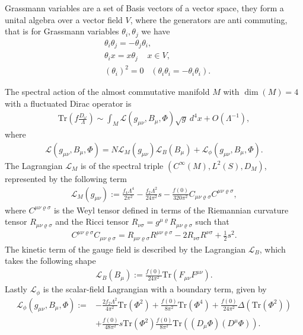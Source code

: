 Grassmann variables are a set of Basis vectors of a vector space, they
form a unital algebra over a vector field $V$, where the generators are
anti commuting, that is for Grassmann variables $\theta _i, \theta _j$  we have
\begin{align}
    &\theta _i \theta _j = -\theta _j \theta _i, \\
    &\theta _i x = x\theta _j \;\;\;\; x\in V, \\
    &(\theta_i)^2 = 0 \;\;\; (\theta _i \theta _i = -\theta _i \theta _i).
\end{align}
\begin{myproposition}
    The spectral action of the almost commutative manifold $M$ with $\dim(M)
    =4$ with a fluctuated Dirac operator is
    \begin{align}
        \text{Tr}(f\frac{D_\omega}{\Lambda}) \sim \int_M \mathcal{L}(g_{\mu\nu},
         B_\mu, \Phi) \sqrt{g}\ d^4x + O(\Lambda^{-1}),
    \end{align}
    where
    \begin{align}
        \mathcal{L}(g_{\mu\nu}, B_\mu, \Phi) =
        N\mathcal{L}_M(g_{\mu\nu})
        \mathcal{L}_B(B_\mu)+
        \mathcal{L}_\phi(g_{\mu\nu}, B_\mu, \Phi).
    \end{align}
    The Lagrangian $\mathcal{L}_M$ is of the spectral triple $(C^\infty(M) ,
    L^2(S), D_M)$, represented by the following term
    \begin{align}\label{lagr}
        \mathcal{L}_M(g_{\mu\nu}) := \frac{f_4 \Lambda ^4}{2\pi^2} -
        \frac{f_2 \Lambda^2}{24\pi ^2}s - \frac{f(0)}{320\pi^2} C_{\mu\nu
        \varrho \sigma}C^{\mu\nu \varrho \sigma},
    \end{align}
    where $C^{\mu\nu \varrho \sigma}$ is the Weyl tensor defined in terms of the Riemannian
    curvature tensor $R_{\mu\nu \varrho \sigma}$ and the Ricci tensor
    $R_{\nu\sigma} = g^{\mu\varrho} R_{\mu\nu \varrho\sigma}$ such that
    \begin{align}
        C^{\mu\nu\varrho\sigma}C_{\mu\nu\varrho\sigma}=
        R_{\mu\nu\varrho\sigma}R^{\mu\nu\varrho\sigma} -
        2R_{\nu\sigma}R^{\nu\sigma} + \frac{1}{2}s^2.
    \end{align}
    The kinetic term of the gauge field is described by the Lagrangian
    $\mathcal{L}_B$, which takes the following shape
    \begin{align}
        \mathcal{L}_B(B_\mu) := \frac{f(0)}{24\pi^2}
        \text{Tr}(F_{\mu\nu}F^{\mu\nu}).
    \end{align}
    Lastly $\mathcal{L}_\phi$ is the scalar-field Lagrangian with a boundary
    term, given by
    \begin{align}
        \mathcal{L}_\phi(g_{\mu\nu}, B_\mu, \Phi) :=
        &-\frac{2f_2\Lambda^2}{4\pi^2}\text{Tr}(\Phi^2) + \frac{f(0)}{8\pi^2}
        \text{Tr}(\Phi^4) + \frac{f(0)}{24\pi^2}
        \Delta(\text{Tr}(\Phi^2))\nonumber\\
        &+ \frac{f(0)}{48\pi^2}s\text{Tr}(\Phi^2)
        \frac{f(0)}{8\pi^2}\text{Tr}((D_\mu \Phi)(D^\mu \Phi)).
    \end{align}
\end{myproposition}
